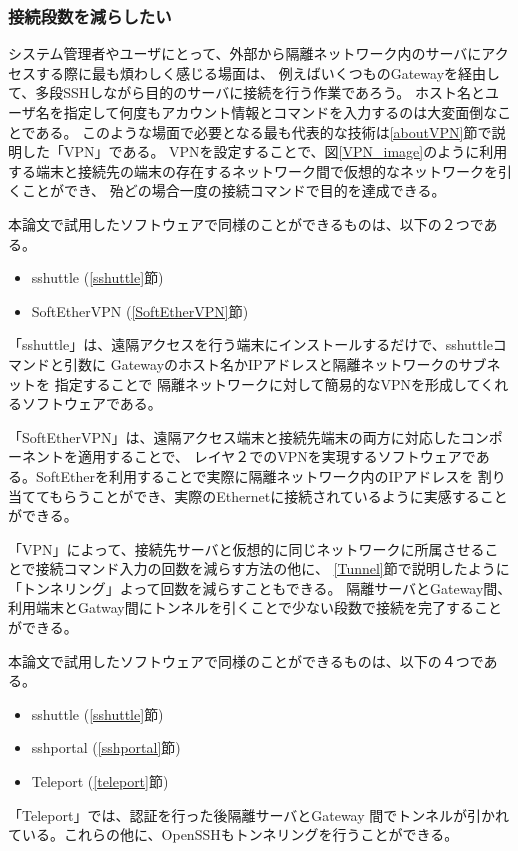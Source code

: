 \documentclass[11pt,a4j,titlepage]{jreport}
\begin{document}
\subsubsection*{接続段数を減らしたい}

システム管理者やユーザにとって、外部から隔離ネットワーク内のサーバにアクセスする際に最も煩わしく感じる場面は、
例えばいくつものGatewayを経由して、多段SSHしながら目的のサーバに接続を行う作業であろう。
ホスト名とユーザ名を指定して何度もアカウント情報とコマンドを入力するのは大変面倒なことである。
このような場面で必要となる最も代表的な技術は\ref{aboutVPN}節で説明した「VPN」である。
VPNを設定することで、図\ref{VPN_image}のように利用する端末と接続先の端末の存在するネットワーク間で仮想的なネットワークを引くことができ、
殆どの場合一度の接続コマンドで目的を達成できる。
\par 本論文で試用したソフトウェアで同様のことができるものは、以下の２つである。
\begin{itemize}
    \item sshuttle (\ref{sshuttle}節)
    \item SoftEtherVPN (\ref{SoftEtherVPN}節)
\end{itemize}\par
「sshuttle」は、遠隔アクセスを行う端末にインストールするだけで、sshuttleコマンドと引数に
Gatewayのホスト名かIPアドレスと隔離ネットワークのサブネットを
指定することで
隔離ネットワークに対して簡易的なVPNを形成してくれるソフトウェアである。

「SoftEtherVPN」は、遠隔アクセス端末と接続先端末の両方に対応したコンポーネントを適用することで、
レイヤ２でのVPNを実現するソフトウェアである。SoftEtherを利用することで実際に隔離ネットワーク内のIPアドレスを
割り当ててもらうことができ、実際のEthernetに接続されているように実感することができる。
\par 
「VPN」によって、接続先サーバと仮想的に同じネットワークに所属させることで接続コマンド入力の回数を減らす方法の他に、
\ref{Tunnel}節で説明したように「トンネリング」よって回数を減らすこともできる。
隔離サーバとGateway間、利用端末とGatway間にトンネルを引くことで少ない段数で接続を完了することができる。

\par 本論文で試用したソフトウェアで同様のことができるものは、以下の４つである。
\begin{itemize}
    \item sshuttle (\ref{sshuttle}節)
    \item sshportal (\ref{sshportal}節)
    \item Teleport (\ref{teleport}節)
\end{itemize}
「Teleport」では、認証を行った後隔離サーバとGateway
間でトンネルが引かれている。これらの他に、OpenSSHもトンネリングを行うことができる。
\end{document}
